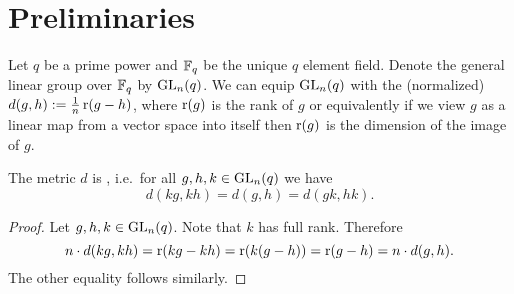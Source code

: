 








\section{Preliminaries}\label{sec:generalDefns}
Let $q$ be a prime power and $\mathbb{F}_q$ be the unique $q$ element field. Denote the general linear group over $\mathbb{F}_q$ by $\operatorname{GL}_n(q)$. We can equip $\operatorname{GL}_n(q)$ with the (normalized)  $d(g,h):=\frac{1}{n}\operatorname{r}(g-h)$, where $\operatorname{r}(g)$ is the rank of $g$ or equivalently if we view $g$ as a linear map from a vector space into itself then $\operatorname{r}(g)$ is the dimension of the image of $g$. 

\begin{lemma}
	The metric $d$ is , i.e.\ for all $g,h,k\in \operatorname{GL}_n(q)$ we have 
	\[d(kg,kh)=d(g,h)=d(gk,hk).\] 
\end{lemma}
\begin{proof}
	Let $g,h,k\in \operatorname{GL}_n(q)$. Note that $k$ has full rank. Therefore
	\[n\cdot d(kg,kh)=\operatorname{r}(kg-kh)=\operatorname{r}(k(g-h))=\operatorname{r}(g-h)=n\cdot d(g,h).\]
	The other equality follows similarly.
\end{proof}


